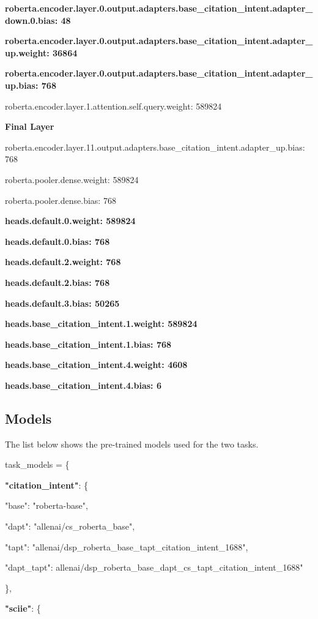 \documentclass[10pt,twocolumn,letterpaper]{article}
\begin{document}
\textbf{roberta.encoder.layer.0.output.adapters.base\_citation\_intent.adapter\_down.0.bias: 48}

\textbf{roberta.encoder.layer.0.output.adapters.base\_citation\_intent.adapter\_up.weight: 36864}

\textbf{roberta.encoder.layer.0.output.adapters.base\_citation\_intent.adapter\_up.bias: 768}

roberta.encoder.layer.1.attention.self.query.weight: 589824

\textbf{Final Layer}

roberta.encoder.layer.11.output.adapters.base\_citation\_intent.adapter\_up.bias: 768

roberta.pooler.dense.weight: 589824

roberta.pooler.dense.bias: 768

\textbf{heads.default.0.weight: 589824}

\textbf{heads.default.0.bias: 768}

\textbf{heads.default.2.weight: 768}

\textbf{heads.default.2.bias: 768}

\textbf{heads.default.3.bias: 50265}

\textbf{heads.base\_citation\_intent.1.weight: 589824}

\textbf{heads.base\_citation\_intent.1.bias: 768}

\textbf{heads.base\_citation\_intent.4.weight: 4608}

\textbf{heads.base\_citation\_intent.4.bias: 6}

\subsection{Models}
The list below shows the pre-trained models used for the two tasks.

task\_models = \{

    \textbf{"citation\_intent"}: \{
    
        "base": "roberta-base",
        
        "dapt": "allenai/cs\_roberta\_base",
        
        "tapt":         "allenai/dsp\_roberta\_base\_tapt\_citation\_intent\_1688",
        
        "dapt\_tapt": allenai/dsp\_roberta\_base\_dapt\_cs\_tapt\_citation\_intent\_1688"
        
    \},

    \textbf{"sciie"}: \{
    
\end{document}
